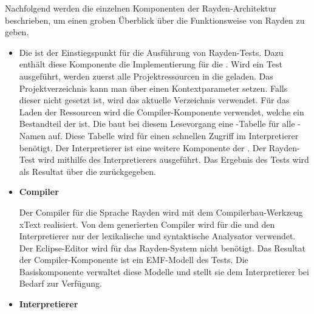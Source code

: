 \SuperPar
Nachfolgend werden die einzelnen Komponenten der Rayden-Architektur beschrieben, um einen groben Überblick über die Funktionsweise von Rayden zu geben.\\

\begin{itemize}

\item \textbf{}

Die  ist der Einstiegspunkt für die Ausführung von Rayden-Tests. Dazu enthält diese Komponente die Implementierung für die . Wird ein Test ausgeführt, werden zuerst alle Projektressourcen in die  geladen. Das Projektverzeichnis kann man über einen Kontextparameter setzen. Falls dieser nicht gesetzt ist, wird das aktuelle Verzeichnis verwendet. Für das Laden der Ressourcen wird die Compiler-Komponente verwendet, welche ein Bestandteil der  ist. Die  baut bei diesem Lesevorgang eine -Tabelle für alle -Namen auf. Diese Tabelle wird für einen schnellen Zugriff im Interpretierer benötigt. Der Interpretierer ist eine weitere Komponente der . Der Rayden-Test wird mithilfe des Interpretierers ausgeführt. Das Ergebnis des Tests wird als Resultat über die  zurückgegeben.\\

\item \textbf{Compiler}

Der Compiler für die Sprache Rayden wird mit dem Compilerbau-Werkzeug xText \cite{xtext} realisiert. Von dem generierten Compiler wird für die  und den Interpretierer nur der lexikalische und syntaktische Analysator verwendet. Der Eclipse-Editor wird für das Rayden-System nicht benötigt. Das Resultat der Compiler-Komponente ist ein EMF-Modell des Tests. Die Basiskomponente  verwaltet diese Modelle und stellt sie dem Interpretierer bei Bedarf zur Verfügung.\\

\item \textbf{Interpretierer}


\end{itemize}
